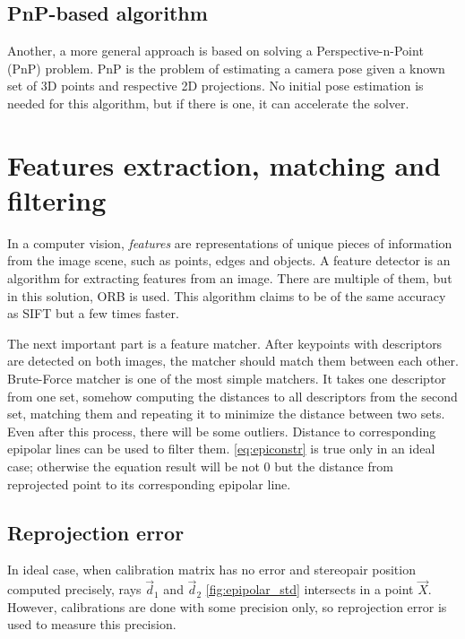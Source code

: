 \subsection{PnP-based algorithm}
\label{sec:pnp}
Another, a more general approach is based on solving a Perspective-n-Point (PnP) problem.
PnP is the problem of estimating a camera pose given a known set of 3D points and respective 2D projections. 
No initial pose estimation is needed for this algorithm, but if there is one, it can accelerate the solver.


\section{Features extraction, matching and filtering}

In a computer vision, \textit{features} are representations of unique pieces of information from the image scene, such as points, edges and objects.
A feature detector is an algorithm for extracting features from an image.
There are multiple of them, but in this solution, ORB \cite{Rublee2011} is used. 
This algorithm claims to be of the same accuracy as SIFT but a few times faster. 

The next important part is a feature matcher. 
After keypoints with descriptors are detected on both images, the matcher should match them between each other.
Brute-Force matcher is one of the most simple matchers.
It takes one descriptor from one set, somehow computing the distances to all descriptors from the second set, matching them and repeating it to minimize the distance between two sets.
Even after this process, there will be some outliers.
Distance to corresponding epipolar lines can be used to filter them. \autoref{eq:epiconstr} is true only in an ideal case; otherwise the equation result will be not $0$ but the distance from reprojected point to its corresponding epipolar line.

\subsection{Reprojection error}
In ideal case, when calibration matrix has no error and stereopair position computed precisely, rays $\vec{d}_1$ and $\vec{d}_2$ \autoref{fig:epipolar_std} intersects in a point $\vec{X}$. 
However, calibrations are done with some precision only, so reprojection error is used to measure this precision.

